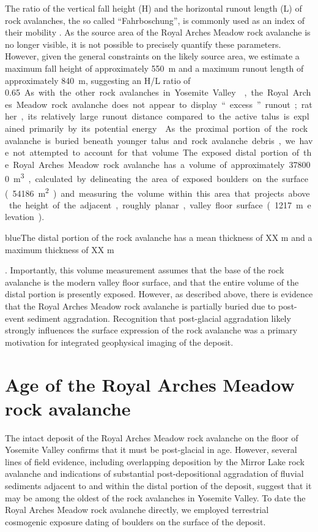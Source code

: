 \documentclass[utf8]{frontiersSCNS}
\newcommand{\COMON}{\begin{color}{blue}}
\newcommand{\COMOFF}{\end{color}}
\begin{document}
The ratio of the vertical fall height (H) and the horizontal runout length (L) of rock avalanches, the so called “Fahrboschung”, is commonly used as an index of their mobility \cite[e.g.][]{hsu1975sturzstroms, corominas1996angle}. As the source area of the Royal Arches Meadow rock avalanche is no longer visible, it is not possible to precisely quantify these parameters. However, given the general constraints on the likely source area, we estimate a maximum fall height of approximately \SI{550}{m} and a maximum runout length of approximately \SI{840}{m}, suggesting an H/L ratio of \SI{0.65}.  As with the other rock avalanches in Yosemite Valley \citep{wieczorek1999rock}, the Royal Arches Meadow rock avalanche does not appear to display “excess” runout; rather, its relatively large runout distance compared to the active talus is explained primarily by its potential energy \cite[e.g.][]{brian1998long}.
	
As the proximal portion of the rock avalanche is buried beneath younger talus and rock avalanche debris, we have not attempted to account for that volume. The exposed distal portion of the Royal Arches Meadow rock avalanche has a volume of approximately \SI{378000}{m^3}, calculated by delineating the area of exposed boulders on the surface (\SI{54186}{m^2}) and measuring the volume within this area that projects above the height of the adjacent, roughly planar, valley floor surface (\SI{1217}{m} elevation).  \COMON The distal portion of the rock avalanche has a mean thickness of XX m and a maximum thickness of XX m \COMOFF. Importantly, this volume measurement assumes that the base of the rock avalanche is the modern valley floor surface, and that the entire volume of the distal portion is presently exposed.  However, as described above, there is evidence that the Royal Arches Meadow rock avalanche is partially buried due to post-event sediment aggradation.  Recognition that post-glacial aggradation likely strongly influences the surface expression of the rock avalanche was a primary motivation for integrated geophysical imaging of the deposit.  

                                

\section{Age of the Royal Arches Meadow rock avalanche}\label{sec:age}

The intact deposit of the Royal Arches Meadow rock avalanche on the floor of Yosemite Valley confirms that it must be post-glacial in age.  However, several lines of field evidence, including overlapping deposition by the Mirror Lake rock avalanche and indications of substantial post-depositional aggradation of fluvial sediments adjacent to and within the distal portion of the deposit, suggest that it may be among the oldest of the rock avalanches in Yosemite Valley. To date the Royal Arches Meadow rock avalanche directly, we employed terrestrial cosmogenic  exposure dating of boulders on the surface of the deposit.
\end{document}
